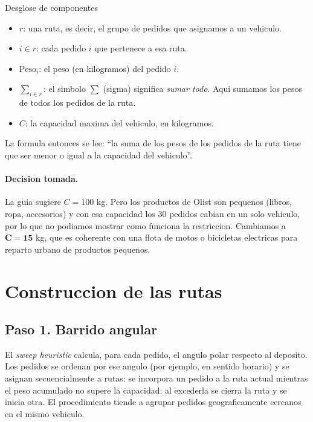 \documentclass[11pt,a4paper]{article}
\begin{document}
\begin{explica}{Desglose de componentes}
\begin{itemize}[leftmargin=*,nosep]
  \item $r$: una ruta, es decir, el grupo de pedidos que asignamos a
        un vehiculo.
  \item $i \in r$: cada pedido $i$ que pertenece a esa ruta.
  \item $\text{Peso}_i$: el peso (en kilogramos) del pedido $i$.
  \item $\sum_{i \in r}$: el simbolo $\sum$ (sigma) significa
        \emph{sumar todo}. Aqui sumamos los pesos de todos los pedidos
        de la ruta.
  \item $C$: la capacidad maxima del vehiculo, en kilogramos.
\end{itemize}
La formula entonces se lee: ``la suma de los pesos de los pedidos de la
ruta tiene que ser menor o igual a la capacidad del vehiculo''.
\end{explica}

\paragraph{Decision tomada.} La guia sugiere $C = 100$ kg. Pero los
productos de Olist son pequenos (libros, ropa, accesorios) y con esa
capacidad los 30 pedidos cabian en un solo vehiculo, por lo que no
podiamos mostrar como funciona la restriccion. Cambiamos a
$\mathbf{C = 15}$ kg, que es coherente con una flota de motos o
bicicletas electricas para reparto urbano de productos pequenos.

\section{Construccion de las rutas}

\subsection{Paso 1. Barrido angular}
El \emph{sweep heuristic} calcula, para cada pedido, el angulo polar
respecto al deposito. Los pedidos se ordenan por ese angulo (por
ejemplo, en sentido horario) y se asignan secuencialmente a rutas: se
incorpora un pedido a la ruta actual mientras el peso acumulado no
supere la capacidad; al excederla se cierra la ruta y se inicia otra.
El procedimiento tiende a agrupar pedidos geograficamente cercanos en
el mismo vehiculo.
\end{document}
